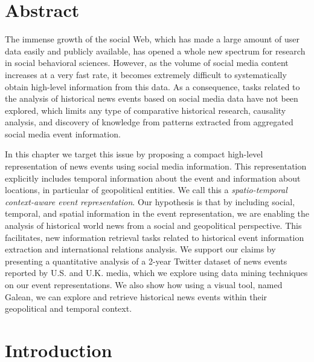 
\section*{Abstract}

The immense growth of the social Web, which has made a large amount of user data
easily and publicly available, has opened a whole new spectrum for research in
social behavioral sciences.  
%
However, as the volume of social media content increases at a very fast rate, it
becomes extremely difficult to systematically obtain high-level information from
this data.  
%
As a consequence, tasks related to the analysis of historical news events based
on social media data have not been explored, which limits any type of
comparative historical research, causality analysis, and discovery of knowledge
from patterns extracted from aggregated social media event information.

In this chapter we target this issue by proposing a compact high-level
representation of news events using social media information. 
%
This representation explicitly includes temporal information about the event and
information about locations, in particular of geopolitical entities. 
%
We call this a {\em spatio-temporal context-aware event representation}. 
%
Our hypothesis is that by including social, temporal, and spatial information in
the event representation, we are enabling the analysis of historical world news
from a social and geopolitical perspective.  
%
This facilitates, new information retrieval tasks related to historical event
information extraction and international relations analysis. 
%
We support our claims by presenting a quantitative analysis of a 2-year Twitter
dataset of news events reported by U.S. and U.K.  media, which we explore using
data mining techniques on our event representations. 
%
We also show how using a visual tool, named Galean, we can explore and retrieve
historical news events within their geopolitical and temporal context.




\section{Introduction}\label{sec:introduction}

